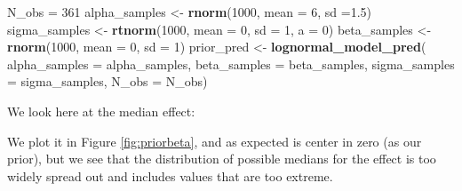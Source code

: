 \documentclass[12pt,]{krantz}
\newenvironment{Shaded}{\begin{snugshade}}{\end{snugshade}}
\newcommand{\DataTypeTok}[1]{\textcolor[rgb]{0.13,0.29,0.53}{#1}}
\newcommand{\DecValTok}[1]{\textcolor[rgb]{0.00,0.00,0.81}{#1}}
\newcommand{\FloatTok}[1]{\textcolor[rgb]{0.00,0.00,0.81}{#1}}
\newcommand{\KeywordTok}[1]{\textcolor[rgb]{0.13,0.29,0.53}{\textbf{#1}}}
\newcommand{\NormalTok}[1]{#1}
\newcommand{\OperatorTok}[1]{\textcolor[rgb]{0.81,0.36,0.00}{\textbf{#1}}}
\newcommand{\OtherTok}[1]{\textcolor[rgb]{0.56,0.35,0.01}{#1}}
\newcommand{\StringTok}[1]{\textcolor[rgb]{0.31,0.60,0.02}{#1}}
\theoremstyle{definition}
\theoremstyle{definition}
\theoremstyle{definition}
\theoremstyle{remark}
\begin{document}
\begin{Shaded}
\begin{Highlighting}[]
\NormalTok{N_obs =}\StringTok{ }\DecValTok{361}
\NormalTok{alpha_samples <-}\StringTok{ }\KeywordTok{rnorm}\NormalTok{(}\DecValTok{1000}\NormalTok{, }\DataTypeTok{mean =} \DecValTok{6}\NormalTok{, }\DataTypeTok{sd =}\FloatTok{1.5}\NormalTok{)}
\NormalTok{sigma_samples <-}\StringTok{ }\KeywordTok{rtnorm}\NormalTok{(}\DecValTok{1000}\NormalTok{, }\DataTypeTok{mean =} \DecValTok{0}\NormalTok{, }\DataTypeTok{sd =} \DecValTok{1}\NormalTok{, }\DataTypeTok{a =} \DecValTok{0}\NormalTok{)}
\NormalTok{beta_samples <-}\StringTok{ }\KeywordTok{rnorm}\NormalTok{(}\DecValTok{1000}\NormalTok{, }\DataTypeTok{mean =} \DecValTok{0}\NormalTok{, }\DataTypeTok{sd =} \DecValTok{1}\NormalTok{)}
\NormalTok{prior_pred <-}\StringTok{ }\KeywordTok{lognormal_model_pred}\NormalTok{(}
    \DataTypeTok{alpha_samples =}\NormalTok{ alpha_samples,}
    \DataTypeTok{beta_samples =}\NormalTok{ beta_samples, }
    \DataTypeTok{sigma_samples =}\NormalTok{ sigma_samples,}
    \DataTypeTok{N_obs =}\NormalTok{ N_obs)}
\end{Highlighting}
\end{Shaded}

We look here at the median effect:

\begin{Shaded}
\end{Shaded}

We plot it in Figure \ref{fig:priorbeta}, and as expected is center in zero (as our prior), but we see that the distribution of possible medians for the effect is too widely spread out and includes values that are too extreme.



\begin{Shaded}
\end{Shaded}
\end{document}

